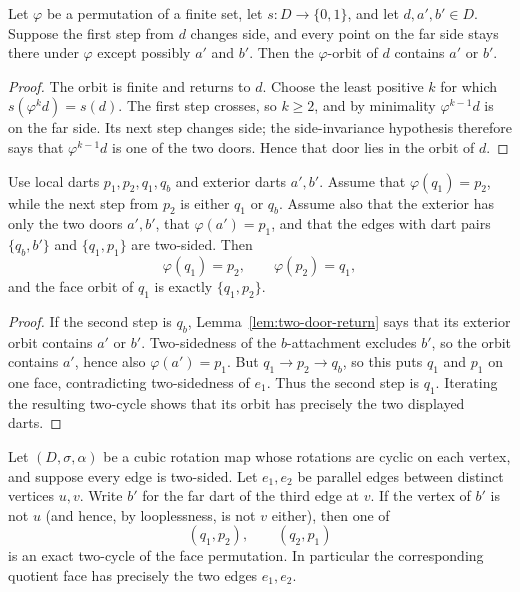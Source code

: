 \begin{lemma}\label{lem:two-door-return}
Let $\varphi$ be a permutation of a finite set, let
$s\colon D\to\{0,1\}$, and let $d,a',b'\in D$.  Suppose the first step from
$d$ changes side, and every point on the far side stays there under
$\varphi$ except possibly $a'$ and $b'$.  Then the $\varphi$-orbit of $d$
contains $a'$ or $b'$.
\end{lemma}

\begin{proof}
The orbit is finite and returns to $d$.  Choose the least positive $k$ for
which $s(\varphi^k d)=s(d)$.  The first step crosses, so $k\geq2$, and by
minimality $\varphi^{k-1}d$ is on the far side.  Its next step changes side;
the side-invariance hypothesis therefore says that
$\varphi^{k-1}d$ is one of the two doors.  Hence that door lies in the orbit
of $d$.
\end{proof}

\begin{lemma}\label{lem:digon-local-closes}
Use local darts $p_1,p_2,q_1,q_b$ and exterior darts $a',b'$.  Assume that
$\varphi(q_1)=p_2$, while the next step from $p_2$ is either $q_1$ or $q_b$.
Assume also that the exterior has only the two doors $a',b'$, that
$\varphi(a')=p_1$, and that the edges with dart pairs
$\{q_b,b'\}$ and $\{q_1,p_1\}$ are two-sided.  Then
\[
  \varphi(q_1)=p_2,\qquad \varphi(p_2)=q_1,
\]
and the face orbit of $q_1$ is exactly $\{q_1,p_2\}$.
\end{lemma}

\begin{proof}
If the second step is $q_b$, Lemma~\ref{lem:two-door-return} says that its
exterior orbit contains $a'$ or $b'$.  Two-sidedness of the $b$-attachment
excludes $b'$, so the orbit contains $a'$, hence also
$\varphi(a')=p_1$.  But $q_1\to p_2\to q_b$, so this puts $q_1$ and $p_1$
on one face, contradicting two-sidedness of $e_1$.  Thus the second step is
$q_1$.  Iterating the resulting two-cycle shows that its orbit has precisely
the two displayed darts.
\end{proof}

\begin{lemma}
\label{lem:digon-map-closes}
Let $(D,\sigma,\alpha)$ be a cubic rotation map whose rotations are cyclic on
each vertex, and suppose every edge is two-sided. Let $e_1,e_2$ be parallel
edges between distinct vertices $u,v$. Write $b'$ for the far dart of the
third edge at $v$. If the vertex of $b'$ is not $u$ (and hence, by
looplessness, is not $v$ either), then one of
\[
  (q_1,p_2),\qquad (q_2,p_1)
\]
is an exact two-cycle of the face permutation. In particular the
corresponding quotient face has precisely the two edges $e_1,e_2$.
\end{lemma}

